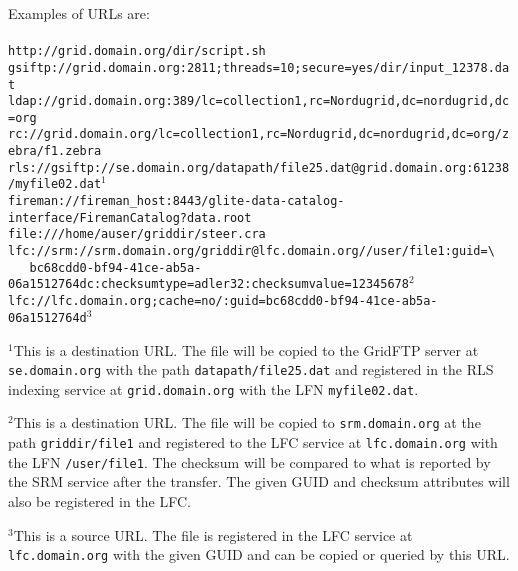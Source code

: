 \begin{framed}
   Examples of URLs are:\\
   \\
   \verb#http://grid.domain.org/dir/script.sh#\\
   \verb#gsiftp://grid.domain.org:2811;threads=10;secure=yes/dir/input_12378.dat#\\
   \verb#ldap://grid.domain.org:389/lc=collection1,rc=Nordugrid,dc=nordugrid,dc=org#\\
   \verb#rc://grid.domain.org/lc=collection1,rc=Nordugrid,dc=nordugrid,dc=org/zebra/f1.zebra#\\
   \verb#rls://gsiftp://se.domain.org/datapath/file25.dat@grid.domain.org:61238/myfile02.dat#$^1$\\
   \verb#fireman://fireman_host:8443/glite-data-catalog-interface/FiremanCatalog?data.root#\\
   \verb#file:///home/auser/griddir/steer.cra#\\
   \verb#lfc://srm://srm.domain.org/griddir@lfc.domain.org//user/file1:guid=\# \\
   \verb#   bc68cdd0-bf94-41ce-ab5a-06a1512764dc:checksumtype=adler32:checksumvalue=12345678#$^2$\\
   \verb#lfc://lfc.domain.org;cache=no/:guid=bc68cdd0-bf94-41ce-ab5a-06a1512764d#$^3$
\end{framed}

$^1$This is a destination URL. The file will be copied to the GridFTP
server at \texttt{se.domain.org} with the path \texttt{datapath/file25.dat} and
registered in the RLS indexing service at \texttt{grid.domain.org} with the LFN
\texttt{myfile02.dat}.

$^2$This is a destination URL. The file will be copied to
\texttt{srm.domain.org} at the path \texttt{griddir/file1} and registered to the LFC
service at \texttt{lfc.domain.org} with the
LFN \texttt{/user/file1}. The checksum will be compared to what is
reported by the SRM service after the transfer. The given GUID and
checksum attributes will also be registered in the LFC.

$^3$This is a source URL. The file is registered in the LFC service at
\texttt{lfc.domain.org} with the given GUID and can be copied or queried by
this URL.
